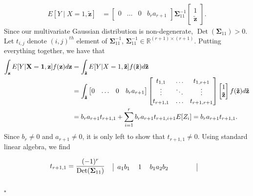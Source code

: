 \documentclass[11pt,a4paper]{article}
\newenvironment{proofof}[1][]{\begin{trivlist}
   \item[\hskip \labelsep {\bfseries Proof of #1.}]}{\hfill{}$\square$\end{trivlist}}
\DeclareMathOperator{\Det}{Det}
\begin{document}
\begin{proofof}[Theorem~\ref{theorem:completeness ac}]
\begin{enumerate}[label=(\roman*)]
{\begin{align*}
 E[ Y \mid X=1,\mathbf{\tilde{z}}] &= \begin{bmatrix}
       0 &  \dots & 0 & b_r a_{r+1}
     \end{bmatrix}
      \mathbf{\Sigma}_{11}^{-1}
     \begin{bmatrix}
       1  \\
       \mathbf{\tilde{z}}
     \end{bmatrix}.  
\end{align*}
{ Since our multivariate Gaussian distribution is non-degenerate, $\Det(\mathbf{\Sigma}_{11}) > 0$.}
Let $t_{i,j}$ denote $(i,j)^{th}$ element of $\mathbf{\Sigma}_{11}^{-1} $, $\mathbf{\Sigma}_{11}^{-1} \in \mathbb{R}^{(r+1)\times(r+1)}$.
Putting everything together, we have that
\begin{align}
 \int_{\mathbf{z}}E[Y |\mathbf{X =1}, \mathbf{z}]f(\mathbf{z})d\mathbf{z} &= \int_{\mathbf{\tilde{z}}}E[Y |X=1, \mathbf{\tilde{z}}]f(\mathbf{\tilde{z}})d\mathbf{\tilde{z}} \nonumber \\ 
 &=  \int_{\mathbf{\tilde{z}}}\begin{bmatrix}
       0 & \smash{\dots} & 0 & b_{r}a_{r+1}
     \end{bmatrix}
      \begin{bmatrix}
        t_{1,1}  	&  \smash{\dots}    &  t_{1,r+1}   	\\
      	\vdots   	&  \smash{\ddots}   &  \vdots    	\\
      	t_{r+1,1}  	& \smash{\dots}	&  t_{r+1,r+1}
   \end{bmatrix}
     \begin{bmatrix}
       1  \\
       \mathbf{\tilde{z}}
     \end{bmatrix}f(\mathbf{\tilde{z}})d\mathbf{\tilde{z}}  \nonumber\\
       &= b_{r}a_{r+1}t_{r+1,1} + \sum_{i=1}^r b_{r}a_{r+1}t_{r+1,i+1} E[Z_i]  = b_{r}a_{r+1}t_{r+1,1}. \nonumber
\end{align}
Since $b_r \neq 0$ and $a_{r+1} \neq 0$, it is only left to show that $t_{r+1,1} \neq 0$. Using standard linear algebra, we find
\begin{align*}
t_{r+1,1} &= \frac{(-1)^{r}}{\Det(\mathbf{\Sigma}_{11})} \begin{blockarray}{ccccccc}
     	&	   	& 				&  				 	&          &  		\\
\begin{block}{c|cccccc|}
		&  a_1b_1  		&  1	  	&  b_1a_2b_2    &  	   					&      					&  							\\

\end{block}
\end{blockarray}
\end{align*}}
\end{enumerate}
\end{proofof}
\end{document}
